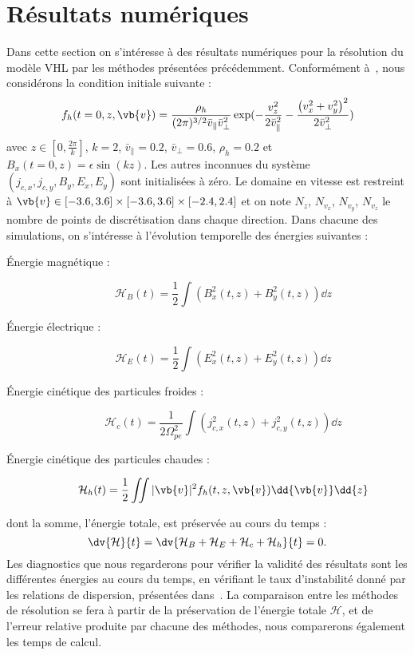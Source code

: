 
\section{Résultats numériques}
\label{sec:3:num}

Dans cette section on s'intéresse à des résultats numériques pour la résolution du modèle VHL par les méthodes présentées précédemment. Conformément à~\cite{Holderied:2020}, nous considérons la condition initiale suivante :
$$
  f_h(t=0,z,\vb{v}) = \frac{\rho_h}{(2\pi)^{3/2}\bar{v}_{\|}\bar{v}_\perp^2}\exp( - \frac{v_z^2}{2\bar{v}_{\|}^2} - \frac{\left( v_x^2 + v_y^2 \right)^2}{2\bar{v}_\perp^2} )
$$
avec $z\in[0,\frac{2\pi}{k}]$, $k=2$, $\bar{v}_{\|}=0.2$, $\bar{v}_\perp=0.6$, $\rho_h=0.2$ et $B_x(t=0,z)=\epsilon\sin(kz)$. Les autres inconnues du système $(j_{c,x},j_{c,y},B_y,E_x,E_y)$ sont initialisées à zéro. Le domaine en vitesse est restreint à $\vb{v}\in[-3.6,3.6]\times[-3.6,3.6]\times[-2.4,2.4]$ et on note $N_z$, $N_{v_x}$, $N_{v_y}$, $N_{v_z}$ le nombre de points de discrétisation dans chaque direction. Dans chacune des simulations, on s'intéresse à l'évolution temporelle des énergies suivantes :
\begin{description}
  \item[Énergie magnétique : ] \begin{equation}\label{eq:3:nrj:me}\mathcal{H}_B(t) = \frac{1}{2}\int \left( B_x^2(t,z) + B_y^2(t,z) \right)\dd{z}\end{equation}
  \item[Énergie électrique : ] \begin{equation}\label{eq:3:nrj:ee}\mathcal{H}_E(t) = \frac{1}{2}\int \left( E_x^2(t,z) + E_y^2(t,z) \right)\dd{z}\end{equation}
  \item[Énergie cinétique des particules froides : ] \begin{equation}\label{eq:3:nrj:ce}\mathcal{H}_c(t) = \frac{1}{2\Omega_{pe}^2}\int \left( j_{c,x}^2(t,z) + j_{c,y}^2(t,z) \right)\dd{z}\end{equation}
  \item[Énergie cinétique des particules chaudes :  ] \begin{equation}\label{eq:3:nrj:he}\mathcal{H}_h(t) = \frac{1}{2}\iint |\vb{v}|^2 f_h(t,z,\vb{v}) \dd{\vb{v}}\dd{z}\end{equation}
\end{description}
dont la somme, l'énergie totale, est préservée au cours du temps :
$$
  \dv{\mathcal{H}}{t} = \dv{\mathcal{H}_B+\mathcal{H}_E+\mathcal{H}_c+\mathcal{H}_h}{t} = 0.
$$
Les diagnostics que nous regarderons pour vérifier la validité des résultats sont les différentes énergies au cours du temps, en vérifiant le taux d'instabilité donné par les relations de dispersion, présentées dans~\cite{Holderied:2020}. La comparaison entre les méthodes de résolution se fera à partir de la préservation de l'énergie totale $\mathcal{H}$, et de l'erreur relative produite par chacune des méthodes, nous comparerons également les temps de calcul.

